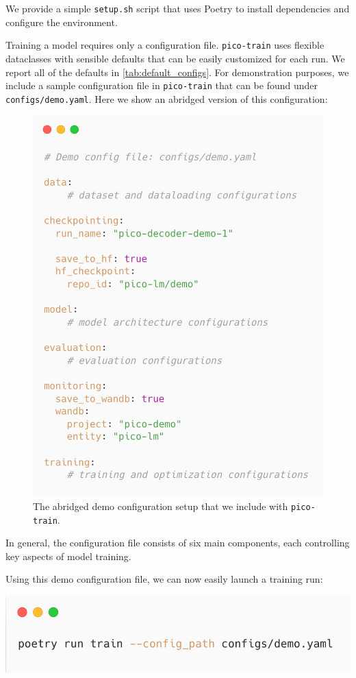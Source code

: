 {We provide a simple \verb|setup.sh| script that uses Poetry \citep{poetry} to install dependencies and configure the environment.

Training a model requires only a configuration file. \texttt{pico-train} uses flexible dataclasses with sensible defaults that can be easily customized for each run. We report all of the defaults in \cref{tab:default_configs}. For demonstration purposes, we include a sample configuration file in \texttt{pico-train} that can be found under \verb|configs/demo.yaml|. Here we show an abridged version of this configuration:

\begin{figure}[h!] 
    \centering
    \includegraphics[width=0.7\columnwidth]{chapters/pico/figures/demo/demo_config.png}
    \caption{The abridged demo configuration setup that we include with \texttt{pico-train}.}
    \label{fig:demo_config}
\end{figure}

In general, the configuration file consists of six main components, each controlling key aspects of model training. 

Using this demo configuration file, we can now easily launch a training run:

\begin{center}
    \includegraphics[width=0.7\columnwidth]{chapters/pico/figures/demo/demo_run.png}
\end{center}

}
